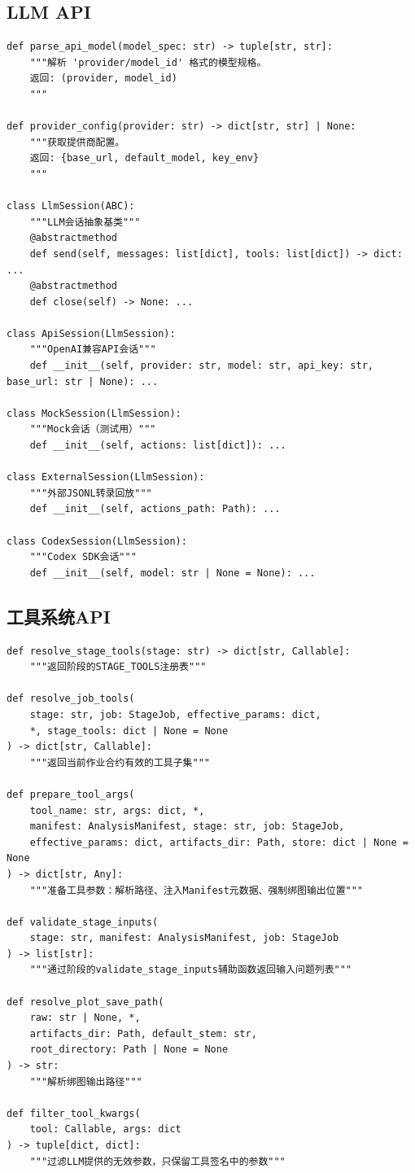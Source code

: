 \documentclass[12pt,a4paper]{ctexart}
\begin{document}
\subsection{LLM API}

\begin{lstlisting}[caption={core/llm.py 核心接口}]
def parse_api_model(model_spec: str) -> tuple[str, str]:
    """解析 'provider/model_id' 格式的模型规格。
    返回: (provider, model_id)
    """

def provider_config(provider: str) -> dict[str, str] | None:
    """获取提供商配置。
    返回: {base_url, default_model, key_env}
    """

class LlmSession(ABC):
    """LLM会话抽象基类"""
    @abstractmethod
    def send(self, messages: list[dict], tools: list[dict]) -> dict: ...
    @abstractmethod
    def close(self) -> None: ...

class ApiSession(LlmSession):
    """OpenAI兼容API会话"""
    def __init__(self, provider: str, model: str, api_key: str, base_url: str | None): ...

class MockSession(LlmSession):
    """Mock会话（测试用）"""
    def __init__(self, actions: list[dict]): ...

class ExternalSession(LlmSession):
    """外部JSONL转录回放"""
    def __init__(self, actions_path: Path): ...

class CodexSession(LlmSession):
    """Codex SDK会话"""
    def __init__(self, model: str | None = None): ...
\end{lstlisting}

\subsection{工具系统API}

\begin{lstlisting}[caption={core/tools.py 核心接口}]
def resolve_stage_tools(stage: str) -> dict[str, Callable]:
    """返回阶段的STAGE_TOOLS注册表"""

def resolve_job_tools(
    stage: str, job: StageJob, effective_params: dict,
    *, stage_tools: dict | None = None
) -> dict[str, Callable]:
    """返回当前作业合约有效的工具子集"""

def prepare_tool_args(
    tool_name: str, args: dict, *,
    manifest: AnalysisManifest, stage: str, job: StageJob,
    effective_params: dict, artifacts_dir: Path, store: dict | None = None
) -> dict[str, Any]:
    """准备工具参数：解析路径、注入Manifest元数据、强制绑图输出位置"""

def validate_stage_inputs(
    stage: str, manifest: AnalysisManifest, job: StageJob
) -> list[str]:
    """通过阶段的validate_stage_inputs辅助函数返回输入问题列表"""

def resolve_plot_save_path(
    raw: str | None, *,
    artifacts_dir: Path, default_stem: str,
    root_directory: Path | None = None
) -> str:
    """解析绑图输出路径"""

def filter_tool_kwargs(
    tool: Callable, args: dict
) -> tuple[dict, dict]:
    """过滤LLM提供的无效参数，只保留工具签名中的参数"""
\end{lstlisting}
\end{document}
